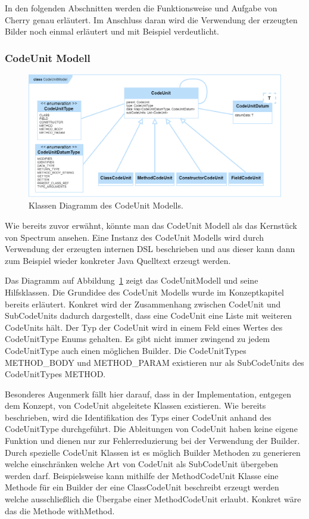 \documentclass[12pt,oneside,a4paper,parskip]{scrbook}
\begin{document}
In den folgenden Abschnitten werden die Funktionsweise und Aufgabe von Cherry genau erläutert. Im Anschluss daran wird die Verwendung der erzeugten Bilder noch einmal erläutert und mit Beispiel verdeutlicht.

\subsubsection{CodeUnit Modell}

\begin{figure}[htbp]
	\centering
	\includegraphics[width=1.0\textwidth]{bilder/classCu}
	\caption{Klassen Diagramm des CodeUnit Modells.}
	\label{fig:classcu}
\end{figure}

Wie bereits zuvor erwähnt, könnte man das CodeUnit Modell als das Kernstück von Spectrum ansehen. Eine Instanz des CodeUnit Modells wird durch Verwendung der erzeugten internen DSL beschrieben und aus dieser kann dann zum Beispiel wieder konkreter Java Quelltext erzeugt werden.

Das Diagramm auf Abbildung~\ref{fig:classcu} zeigt das CodeUnitModell und seine Hilfsklassen.
Die Grundidee des CodeUnit Modells wurde im Konzeptkapitel bereits erläutert. Konkret wird der Zusammenhang zwischen CodeUnit und SubCodeUnits dadurch dargestellt, dass eine CodeUnit eine Liste mit weiteren CodeUnits hält. Der Typ der CodeUnit wird in einem Feld eines Wertes des CodeUnitType Enums gehalten. Es gibt nicht immer zwingend zu jedem CodeUnitType auch einen möglichen Builder. Die CodeUnitTypes METHOD\_BODY und METHOD\_PARAM existieren nur als SubCodeUnits des CodeUnitTypes METHOD.

Besonderes Augenmerk fällt hier darauf, dass in der Implementation, entgegen dem Konzept, von CodeUnit abgeleitete Klassen existieren. Wie bereits beschrieben, wird die Identifikation des Typs einer CodeUnit anhand des CodeUnitType durchgeführt. Die Ableitungen von CodeUnit haben keine eigene Funktion und dienen nur zur Fehlerreduzierung bei der Verwendung der Builder. Durch spezielle CodeUnit Klassen ist es möglich Builder Methoden zu generieren welche einschränken welche Art von CodeUnit als SubCodeUnit übergeben werden darf. Beispielsweise kann mithilfe der MethodCodeUnit Klasse eine Methode für ein Builder der eine ClassCodeUnit beschreibt erzeugt werden welche ausschließlich die Übergabe einer MethodCodeUnit erlaubt. Konkret wäre das die Methode withMethod.
\end{document}
